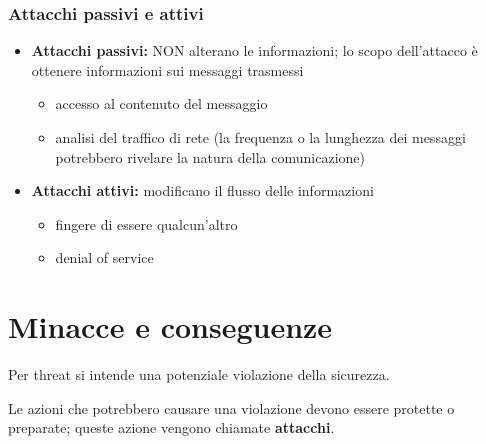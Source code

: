 \subsubsection{Attacchi passivi e attivi}
\begin{itemize}
    \item \textbf{Attacchi passivi:} NON alterano le informazioni; lo scopo dell'attacco è ottenere informazioni sui messaggi trasmessi
    \begin{itemize}
        \item accesso al contenuto del messaggio
        \item analisi del traffico di rete (la frequenza o la lunghezza dei messaggi potrebbero rivelare la natura della comunicazione)
    \end{itemize}
    \item \textbf{Attacchi attivi:} modificano il flusso delle informazioni
    \begin{itemize}
        \item fingere di essere qualcun'altro
        \item denial of service
    \end{itemize}
\end{itemize}

\section{Minacce e conseguenze}
Per threat si intende una potenziale violazione della sicurezza.

Le azioni che potrebbero causare una violazione devono essere protette o preparate; queste azione vengono chiamate \textbf{attacchi}.

